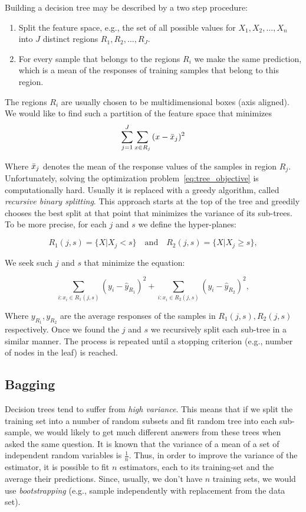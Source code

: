 Building a decision tree may be described by a two step procedure:
\begin{enumerate}
\item Split the feature space, e.g., the set of all possible values
  for $X_1, X_2,\ldots,X_n$ into $J$ distinct regions $R_1, R_2,\ldots, R_J$.
\item For every sample that belongs to the regions $R_i$ we make the
  same prediction, which is a mean of the responses of training
  samples that belong to this region.
\end{enumerate}

The regions $R_i$ are usually chosen to be multidimensional boxes (axis aligned).  We would like to find such a partition of the feature space that minimizes
\begin{equation}\label{eq:tree_objective}
\sum\limits_{j=1}^J\sum_{x\in R_j}{(x-\bar{x}_j)^2}
\end{equation}

Where $\bar{x}_j$ denotes the mean of the response values of the
samples in region $R_j$.  Unfortunately, solving the optimization
problem~\ref{eq:tree_objective} is computationally hard.  Usually it
is replaced with a greedy algorithm, called \textit{recursive binary
  splitting}.  This approach starts at the top of the tree and
greedily chooses the best split at that point that minimizes the
variance of its sub-trees.  To be more precise, for each $j$ and $s$ we
define the hyper-planes:

\begin{equation}
  R_1(j,s) = \{ X\lvert X_j<s \}\quad\text{and}\quad R_2(j,s) = \{ X\lvert X_j \geq s \},
\end{equation}

We seek such $j$ and $s$ that minimize the equation:

\begin{equation}
  \sum\limits_{i:x_i\in R_1(j,s)}{(y_i-\hat{y}_{R_1})}^2 + \sum\limits_{i:x_i\in R_2(j,s)}{(y_i-\hat{y}_{R_2})}^2,
\end{equation}

Where $y_{R_1}, y_{R_2}$ are the average responses of the samples in
$R_1(j,s), R_2(j,s)$ respectively.  Once we found the $j$ and $s$ we
recursively split each sub-tree in a similar manner.  The process is
repeated until a stopping criterion (e.g., number of nodes in the
leaf) is reached.

\subsection{Bagging}
Decision trees tend to suffer from \textit{high variance}. This means
that if we split the training set into a number of random subsets and
fit random tree into each sub-sample, we would likely to get much
different answers from these trees when asked the same question.  It
is known that the variance of a mean of a set of independent random
variables is $\frac{1}{n}$.  Thus, in order to improve the variance of
the estimator, it is possible to fit $n$ estimators, each to its
training-set and the average their predictions.  Since, usually, we
don't have $n$ training sets, we would use \textit{bootstrapping}
(e.g., sample independently with replacement from the data set).

